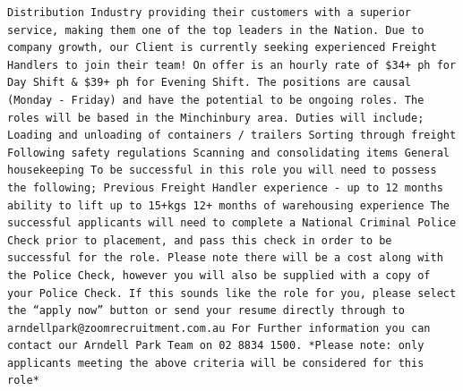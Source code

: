 \documentclass[11pt,a4paper,]{article}
\begin{document}
\begin{verbatim}
Distribution Industry providing their customers with a superior service, making them one of the top leaders in the Nation. Due to company growth, our Client is currently seeking experienced Freight Handlers to join their team! On offer is an hourly rate of $34+ ph for Day Shift & $39+ ph for Evening Shift. The positions are causal (Monday - Friday) and have the potential to be ongoing roles. The roles will be based in the Minchinbury area. Duties will include; Loading and unloading of containers / trailers Sorting through freight Following safety regulations Scanning and consolidating items General housekeeping To be successful in this role you will need to possess the following; Previous Freight Handler experience - up to 12 months ability to lift up to 15+kgs 12+ months of warehousing experience The successful applicants will need to complete a National Criminal Police Check prior to placement, and pass this check in order to be successful for the role. Please note there will be a cost along with the Police Check, however you will also be supplied with a copy of your Police Check. If this sounds like the role for you, please select the “apply now” button or send your resume directly through to arndellpark@zoomrecruitment.com.au For Further information you can contact our Arndell Park Team on 02 8834 1500. *Please note: only applicants meeting the above criteria will be considered for this role*

\end{verbatim}
\end{document}

